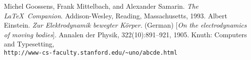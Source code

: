 \documentclass[a4paper,10pt]{article}
\begin{document}
\medskip

\begin{thebibliography}{9}
 Michel Goossens, Frank Mittelbach, and Alexander Samarin. \textit{The \LaTeX\ Companion}. Addison-Wesley, Reading, Massachusetts, 1993.
 Albert Einstein. \textit{Zur Elektrodynamik bewegter K{\"o}rper}. (German) [\textit{On the electrodynamics of moving bodies}]. Annalen der Physik, 322(10):891–921, 1905.
 Knuth: Computers and Typesetting,\\\texttt{http://www-cs-faculty.stanford.edu/\~{}uno/abcde.html}
\end{thebibliography}
\end{document}
